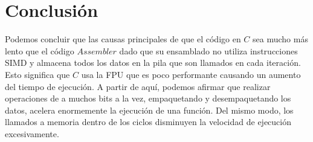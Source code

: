 \documentclass[10pt, a4paper]{article}
\begin{document}
\section{Conclusi\'on}
Podemos concluir que las causas principales de que el código en $C$ sea mucho más lento que el código $Assembler$ dado que su ensamblado no utiliza instrucciones SIMD y almacena todos los datos en la pila que son llamados en cada iteración. Esto significa que $C$ usa la FPU que es poco performante causando un aumento del tiempo de ejecución.\newline
A partir de aquí, podemos afirmar que realizar operaciones de a muchos bits a la vez, empaquetando y desempaquetando los datos, acelera enormemente la ejecución de una función. Del mismo modo, los llamados a memoria dentro de los ciclos disminuyen la velocidad de ejecución excesivamente.
\end{document}
